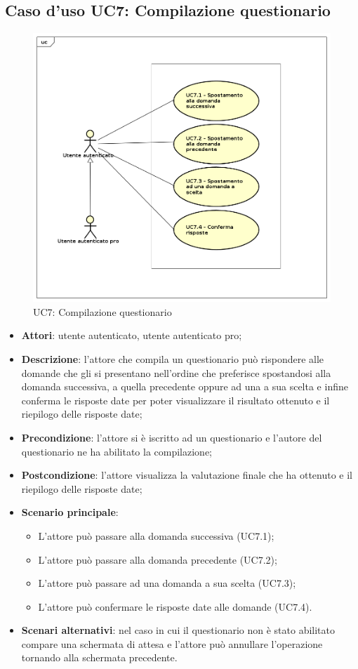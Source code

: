 \newpage
\subsection{Caso d'uso UC7: Compilazione questionario}
\label{UC7}
\begin{figure}[h]
\centering
\includegraphics[scale=0.5,keepaspectratio]{UML/UC7.png}
\caption{UC7: Compilazione questionario}
\end{figure}
\FloatBarrier
\begin{itemize}
\item\textbf{Attori}: utente autenticato, utente autenticato pro;
\item\textbf{Descrizione}: l'attore che compila un questionario può rispondere alle domande che gli si presentano nell'ordine che preferisce spostandosi alla domanda successiva, a quella precedente oppure ad una a sua scelta e infine conferma le risposte date per poter visualizzare il risultato ottenuto e il riepilogo delle risposte date;
\item\textbf{Precondizione}: l'attore si è iscritto ad un questionario e l'autore del questionario ne ha abilitato la compilazione;
\item\textbf{Postcondizione}: l'attore visualizza la valutazione finale che ha ottenuto e il riepilogo delle risposte date;
\item\textbf{Scenario principale}:
\begin{itemize}
\item L'attore può passare alla domanda successiva (UC7.1);
\item L'attore può passare alla domanda precedente (UC7.2);
\item L'attore può passare ad una domanda a sua scelta (UC7.3);
\item L'attore può confermare le risposte date alle domande (UC7.4).
\end{itemize}
\item\textbf{Scenari alternativi}: nel caso in cui il questionario non è stato abilitato compare una schermata di attesa e l'attore può annullare l'operazione tornando alla schermata precedente.
\end{itemize}

